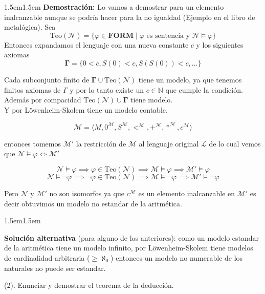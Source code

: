 \documentclass[leqno, 12pt, twoside,letterpaper]{book}
\theoremstyle{plain}
\theoremstyle{definition}
\newcommand{\set}[2]{\{ #1  \mid  #2 \}}
\newcommand{\FORM}[0]{\bm{FORM}}
\newcommand{\naturals}[0]{\mathbb{N}}
\newcommand{\TeoN}[0]{\mbox{Teo}(\mathcal{N})}
\newcommand{\ARITH}[0]{\mathcal{N}}
\newcommand{\MODEL}[0]{\mathscr{M}}
\newcounter{excounter}
\newenvironment{solucion}[0]{\begin{adjustwidth}{1.5em}{1.5em}}{\end{adjustwidth}}
\newenvironment{dem}[0]{\noindent\textbf{Demostración:}}{}
\newenvironment{ej}[1]{\noindent\stepcounter{excounter} \begin{exbox}\textbf{\arabic{excounter}} (#1).}{\end{exbox}}
\begin{document}
\begin{solucion}
\begin{dem}
	Lo vamos a demostrar para un elemento inalcanzable aunque se podría hacer para la no igualdad (Ejemplo en el libro de metalógica). Sea
	 \[\TeoN = \set{\varphi \in \FORM}{ \varphi \mbox{ es sentencia y } \ARITH \models \varphi}\]
\noindent Entonces expandamos el lenguaje con una nueva constante $c$ y los siguientes axiomas
 \[ \bm{\Gamma} = \{ 0 < c, S(0) < c, S(S(0)) < c, \dots \} \]

\noindent Cada subconjunto finito de $\bm{\Gamma} \cup \TeoN$ tiene un modelo, ya que tenemos finitos axiomas de $\Gamma$ y por lo tanto existe un $c \in \naturals$ que cumple la condición.\\
\noindent Además por compacidad $\TeoN \cup \bm{\Gamma}$ tiene modelo. \\
\noindent Y por Löwenheim-Skolem tiene un modelo contable.

	\[ \MODEL = \langle M, 0^{\MODEL}, S^{\MODEL}, <^{\MODEL}, +^{\MODEL}, *^{\MODEL}, c^{\MODEL} \rangle \]

\noindent entonces tomemos $\MODEL'$ la restricción de $\MODEL$ al lenguaje original $\mathcal{L}$ de lo cual vemos que $\ARITH \models \varphi \iff \MODEL' $

\[ \ARITH \models \varphi \implies \varphi \in \TeoN \implies \MODEL \models \varphi \implies \MODEL' \models \varphi \]
\[ \ARITH \models \lnot\varphi \implies \lnot\varphi \in \TeoN \implies \MODEL \models \lnot\varphi \implies \MODEL' \models \lnot\varphi \]

\noindent Pero $\ARITH$ y $\MODEL'$ no son isomorfos ya que $c^{\MODEL}$ es un elemento inalcanzable en $\MODEL'$ es decir obtuvimos un modelo no estandar de la aritmética.

\end{dem}
\end{solucion}

\begin{solucion}

\textbf{Solución alternativa} (para alguno de los anteriores):
como un modelo estandar de la aritmética tiene un modelo infinito, por Löwenheim-Skolem tiene modelos de cardinalidad arbitraria ($\geq \aleph_0$) entonces un modelo no numerable de los naturales no puede ser estandar.

\end{solucion}

\begin{ej}{2}
    Enunciar y demostrar el teorema de la deducción.
\end{ej}
\end{document}
